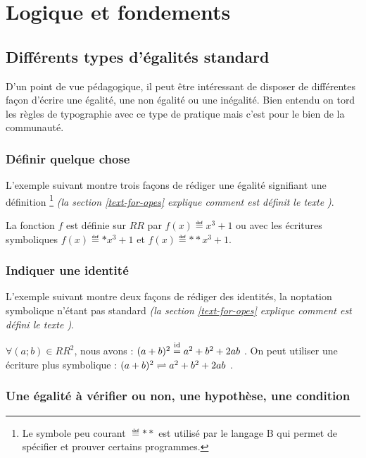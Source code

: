 \documentclass[12pt,a4paper]{article}
\newcommand\RR{RR}
\begin{document}
\section{Logique et fondements}

\subsection{Différents types d'égalités \og standard \fg}

D'un point de vue pédagogique, il peut être intéressant de disposer de différentes façon d'écrire une égalité, une non égalité ou une inégalité.
Bien entendu on tord les règles de typographie avec ce type de pratique mais c'est pour le bien de la communauté.

\subsubsection{Définir quelque chose}

L'exemple suivant montre trois façons de rédiger une égalité signifiant une définition
\footnote{
	Le symbole peu courant $\eqdef**$ est utilisé par le langage B qui permet de spécifier et prouver certains programmes.
}
\emph{(la section \ref{text-for-opes} explique comment est définit le texte \emph{\og \textopdef \fg})}.

\begin{tcblisting}{}
La fonction $f$ est définie sur $\RR$ par $f(x) \eqdef x^3 + 1$ ou avec les écritures
symboliques $f(x) \eqdef* x^3 + 1$ et $f(x) \eqdef** x^3 + 1$.
\end{tcblisting}


\subsubsection{Indiquer une identité}

L'exemple suivant montre deux façons de rédiger des identités, la noptation symbolique n'étant pas standard \emph{(la section \ref{text-for-opes} explique comment est défini le texte \emph{\og \textopid \fg})}.

\begin{tcblisting}{}
$\forall (a ; b) \in \RR^2$, nous avons : $(a + b)^2 \eqid a^2 + b^2 + 2 a b$ .
On peut utiliser une écriture plus symbolique : $(a + b)^2 \eqid* a^2 + b^2 + 2 a b$ .
\end{tcblisting}


\subsubsection{Une égalité à vérifier ou non, une hypothèse, une condition}
\end{document}
